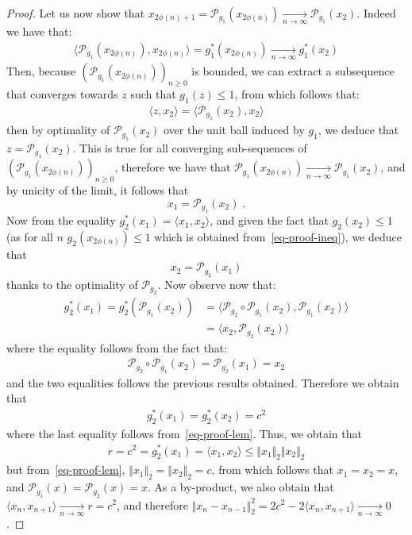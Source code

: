 \begin{proof}
Let us now show that $x_{2\phi(n)+1}=\mathcal{P}_{g_1}(x_{2\phi(n)})\xrightarrow[n\to\infty]{}\mathcal{P}_{g_1}(x_2)$. Indeed we have that:
\begin{align*}
    \langle \mathcal{P}_{g_1}(x_{2\phi(n)}), x_{2\phi(n)}\rangle = g_1^{*}(x_{2\phi(n)})\xrightarrow[n\to\infty]{}g_1^{*}(x_2)
\end{align*}
Then, because $(\mathcal{P}_{g_1}(x_{2\phi(n)}))_{n\geq 0}$ is bounded, we can extract a subsequence that converges towards $z$ such that $g_1(z)\leq 1$, from which follows that:
\begin{align*}
    \langle z,  x_2\rangle = \langle \mathcal{P}_{g_1}(x_2),x_2\rangle
\end{align*}
then by optimality of $\mathcal{P}_{g_1}(x_2)$ over the unit ball induced by $g_1$, we deduce that $z= \mathcal{P}_{g_1}(x_2)$. This is true for all converging sub-sequences of $(\mathcal{P}_{g_1}(x_{2\phi(n)}))_{n\geq 0}$, therefore we have that $\mathcal{P}_{g_1}(x_{2\phi(n)})\xrightarrow[n\to\infty]{}\mathcal{P}_{g_1}(x_2)$, and by unicity of the limit, it follows that 
$$x_1 =\mathcal{P}_{g_1}(x_2)\; .$$
Now from the equality $g_2^{*}(x_1) =  \langle x_1, x_2\rangle $, and given the fact that $g_2(x_2)\leq 1$ (as for all $n$ $g_2(x_{2\phi(n)})\leq 1$ which is obtained from~\eqref{eq-proof-ineq}), we deduce that 
$$x_2 = \mathcal{P}_{g_2}(x_1)$$
thanks to the optimality of $\mathcal{P}_{g_2}$. Now observe now that:
\begin{align*}
    g_2^*(x_1) = g_2^*(\mathcal{P}_{g_1}(x_2)) &= \langle \mathcal{P}_{g_2}\circ  \mathcal{P}_{g_1}(x_2), \mathcal{P}_{g_1}(x_2)\rangle\\
    & = \langle x_2, \mathcal{P}_{g_2}(x_2)\rangle 
\end{align*}
where the equality follows from the fact that:
\begin{align*}
    \mathcal{P}_{g_2}\circ  \mathcal{P}_{g_1}(x_2) = \mathcal{P}_{g_2}(x_1) = x_2
\end{align*}
and the two equalities follows the previous results obtained.
Therefore we obtain that
\begin{align*}
    g_2^*(x_1)  = g_2^{*}(x_2)=c^2
\end{align*}
where the last equality follows from~\eqref{eq-proof-lem}. Thus, we obtain that
\begin{align*}
 r = c^2 = g_2^*(x_1) =\langle x_1,x_2\rangle \leq \Vert x_1\Vert_2 \Vert x_2\Vert_2 
\end{align*}
but from~\eqref{eq-proof-lem}, $\Vert x_1\Vert_2=\Vert x_2\Vert_2=c$, from which follows that $x_1=x_2=x$, and $\mathcal{P}_{g_1}(x)=\mathcal{P}_{g_2}(x)=x$. As a by-product, we also obtain that $\langle x_n, x_{n+1}\rangle \xrightarrow[n\to\infty]{} r=c^2$, and therefore $\Vert x_n - x_{n-1}\Vert_2^2 = 2c^2 - 2\langle x_n,x_{n+1}\rangle \xrightarrow[n\to\infty]{}0$.


\end{proof}
